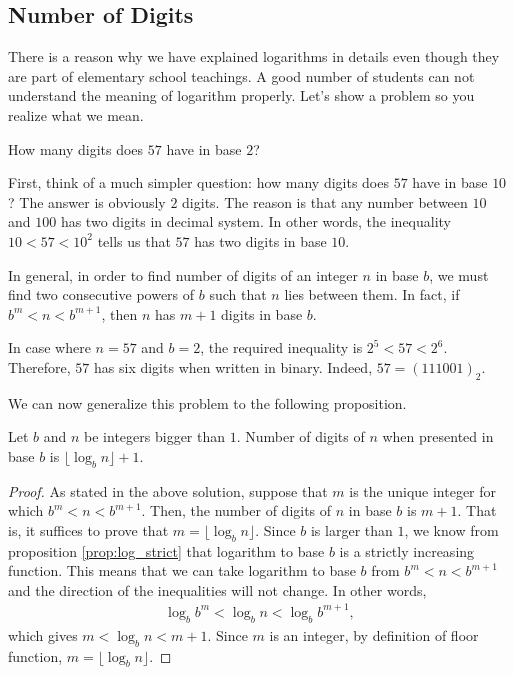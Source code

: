\documentclass{subfile}
\begin{document}
\subsection{Number of Digits}
	There is a reason why we have explained logarithms in details even though they are part of elementary school teachings. A good number of students can not understand the meaning of logarithm properly. Let's show a problem so you realize what we mean.
	\begin{question}
		How many digits does $57$ have in base $2$?
	\end{question}

	\begin{solution}
		First, think of a much simpler question: how many digits does $57$ have in base $10$? The answer is obviously $2$ digits. The reason is that any number between $10$ and $100$ has two digits in decimal system. In other words, the inequality $10<57<10^2$ tells us that $57$ has two digits in base $10$.

		In general, in order to find number of digits of an integer $n$ in base $b$, we must find two consecutive powers of $b$ such that $n$ lies between them. In fact, if $b^m < n <b^{m+1}$, then $n$ has $m+1$ digits in base $b$.

		In case where $n=57$ and $b=2$, the required inequality is $2^5 < 57 <2^6$. Therefore, $57$ has six digits when written in binary. Indeed, $57 = (111001)_2$.
	\end{solution}
	We can now generalize this problem to the following proposition.
	\begin{proposition}
		Let $b$ and $n$ be integers bigger than $1$. Number of digits of $n$ when presented in base $b$ is $\lfloor \log_b n\rfloor +1$.
	\end{proposition}

	\begin{proof}
		As stated in the above solution, suppose that $m$ is the unique integer for which $b^m < n <b^{m+1}$. Then, the number of digits of $n$ in base $b$ is $m+1$. That is, it suffices to prove that $m=\lfloor \log_b n\rfloor$. Since $b$ is larger than $1$, we know from proposition \eqref{prop:log_strict} that logarithm to base $b$ is a strictly increasing function. This means that we can take logarithm to base $b$ from $b^m < n <b^{m+1}$ and the direction of the inequalities will not change. In other words,
		\begin{align*}
		\log_b b^m < \log_b n < \log_b b^{m+1},
		\end{align*}
		which gives $m<\log_b n<m+1$. Since $m$ is an integer, by definition of floor function, $m=\lfloor \log_b n \rfloor$.
	\end{proof}
\end{document}
